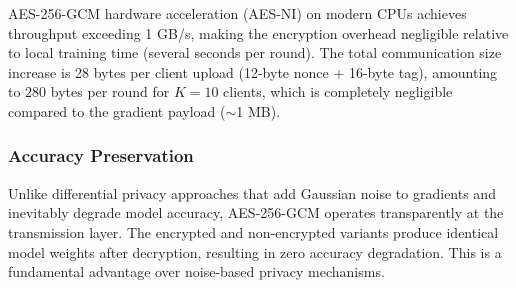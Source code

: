 AES-256-GCM hardware acceleration (AES-NI) on modern CPUs achieves throughput exceeding 1 GB/s, making the encryption overhead negligible relative to local training time (several seconds per round). The total communication size increase is 28 bytes per client upload (12-byte nonce + 16-byte tag), amounting to $280$ bytes per round for $K=10$ clients, which is completely negligible compared to the gradient payload ($\sim$1 MB).

\subsubsection{Accuracy Preservation}

Unlike differential privacy approaches that add Gaussian noise to gradients and inevitably degrade model accuracy, AES-256-GCM operates transparently at the transmission layer. The encrypted and non-encrypted variants produce identical model weights after decryption, resulting in zero accuracy degradation. This is a fundamental advantage over noise-based privacy mechanisms.
